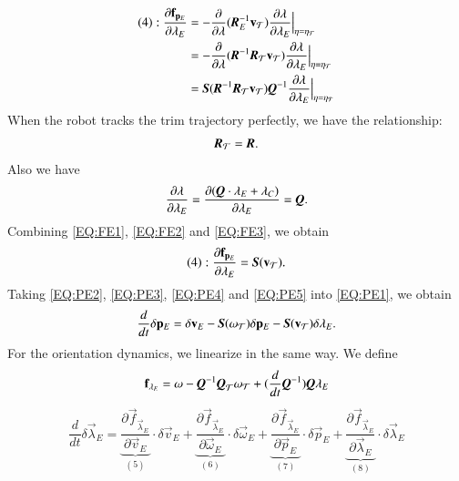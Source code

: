 \begin{align}
(4):\dfrac{\partial \vec{f}_{\vec{p}_{E}}}{\partial \vec{\lambda}_{E}}&=
-\dfrac{\partial}{\partial \vec{\lambda}}(\emph{\textbf{R}}_{E}^{-1}\vec{v}_{\mathcal{T}})
\dfrac{\partial \vec{\lambda}}{\partial \vec{\lambda}_{E}}\Bigr|_{\vec{\eta}=\vec{\eta}_{\mathcal{T}}} 
\nonumber \\
&=-\dfrac{\partial}{\partial \vec{\lambda}}(\emph{\textbf{R}}^{-1}\emph{\textbf{R}}_{\mathcal{T}}
\vec{v}_{\mathcal{T}})\dfrac{\partial \vec{\lambda}}{\partial \vec{\lambda}_{E}}\Bigr|_{\vec{\eta}=\vec{\eta}_{\mathcal{T}}} \nonumber \\
&=\emph{\textbf{S}}(\emph{\textbf{R}}^{-1}\emph{\textbf{R}}_{\mathcal{T}}\vec{v}_{\mathcal{T}})
\emph{\textbf{Q}}^{-1}
\dfrac{\partial \vec{\lambda}}{\partial \vec{\lambda}_{E}}\Bigr|_{\vec{\eta}=\vec{\eta}_{\mathcal{T}}} \label{EQ:FE1}
\end{align}
When the robot tracks the trim trajectory perfectly, we have the relationship:
\begin{align}
 \emph{\textbf{R}}_{\mathcal{T}}=\emph{\textbf{R}}. \label{EQ:FE2}
\end{align}
 Also we have
\begin{align}
\dfrac{\partial \vec{\lambda}}{\partial \vec{\lambda}_{E}}
=\dfrac{\partial (\emph{\textbf{Q}}\cdot\vec{\lambda}_{E}+\vec{\lambda}_{C})}{\partial \vec{\lambda}_{E}}
=\emph{\textbf{Q}}
\label{EQ:FE3}.
\end{align}
Combining \ref{EQ:FE1}, \ref{EQ:FE2} and \ref{EQ:FE3}, we obtain 
\begin{align}
(4):\dfrac{\partial \vec{f}_{\vec{p}_{E}}}{\partial \vec{\lambda}_{E}}=
\emph{\textbf{S}}(\vec{v}_{\mathcal{T}}).\label{EQ:PE5}
\end{align}
Taking \ref{EQ:PE2}, \ref{EQ:PE3}, \ref{EQ:PE4} and \ref{EQ:PE5} into \ref{EQ:PE1}, we obtain
\begin{align}
\dfrac{d}{dt}\delta\vec{p}_{E}=\delta \vec{v}_{E}-\emph{\textbf{S}}(\vec{\omega}_{\mathcal{T}})\delta \vec{p}_{E}-\emph{\textbf{S}}(\vec{v}_{\mathcal{T}})\delta\vec{\lambda}_{E}.
\end{align}
For the orientation dynamics, we linearize in the same way. We define
\begin{align}
\vec{f}_{\vec{\lambda}_{E}}=\vec{\omega}
-\emph{\textbf{Q}}^{-1}\emph{\textbf{Q}}_{\mathcal{T}}
\vec{\omega}_{\mathcal{T}}
+(\dfrac{d}{dt}\emph{\textbf{Q}}^{-1})\emph{\textbf{Q}}\vec{\lambda}_{E}
\end{align}
\begin{align}
\dfrac{d}{dt}\delta\vec{\lambda}_{E}=
\underbrace{\dfrac{\partial \vec{f}_{\vec{\lambda}_{E}}}{\partial \vec{v}_{E}}}_{(5)}\cdot\delta \vec{v}_{E}+
\underbrace{\dfrac{\partial \vec{f}_{\vec{\lambda}_{E}}}{\partial \vec{\omega}_{E}}}_{(6)}\cdot\delta \vec{\omega}_{E}+
\underbrace{\dfrac{\partial \vec{f}_{\vec{\lambda}_{E}}}{\partial \vec{p}_{E}}}_{(7)}\cdot\delta \vec{p}_{E}+
\underbrace{\dfrac{\partial \vec{f}_{\vec{\lambda}_{E}}}{\partial \vec{\lambda}_{E}}}_{(8)}\cdot\delta \vec{\lambda}_{E}\label{EQ:OE2}
\end{align}
